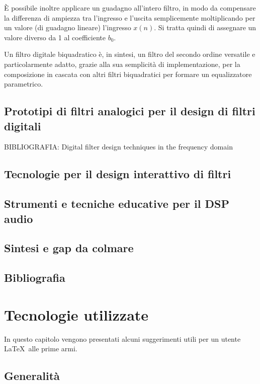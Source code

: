 \documentclass[12pt]{report}
\begin{document}
È possibile inoltre applicare un guadagno all'intero filtro, in modo da compensare la differenza di ampiezza tra l'ingresso e l'uscita semplicemente moltiplicando per un valore (di guadagno lineare) l'ingresso \(x(n)\). Si tratta quindi di assegnare un valore diverso da 1 al coefficiente \(b_0\).

Un filtro digitale biquadratico è, in sintesi, un filtro del secondo ordine versatile e particolarmente adatto, grazie alla sua semplicità di implementazione, per la composizione in cascata con altri filtri biquadratici per formare un equalizzatore parametrico.

\section{Prototipi di filtri analogici per il design di filtri digitali}
BIBLIOGRAFIA: Digital filter design techniques in the frequency domain

\section{Tecnologie per il design interattivo di filtri}

\section{Strumenti e tecniche educative per il DSP audio}

\section{Sintesi e gap da colmare}

\section{Bibliografia}
\printbibliography


%
%

\chapter{Tecnologie utilizzate}
\label{cap3}

In questo capitolo vengono presentati alcuni suggerimenti utili per un utente \LaTeX\ alle prime armi.


\section{Generalit\`a}
\end{document}

